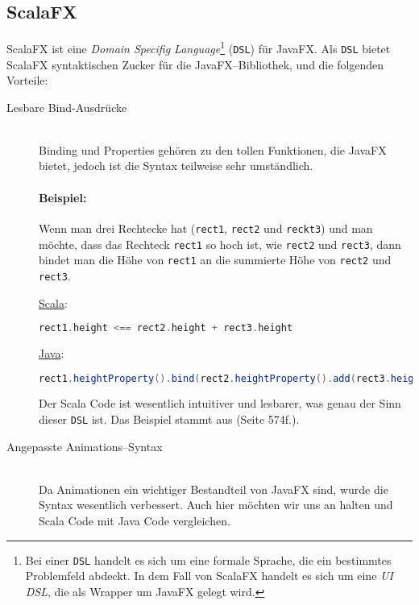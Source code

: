 \subsection{ScalaFX}
ScalaFX ist eine \textit{Domain Specifig Language}\footnote{Bei einer \texttt{DSL} handelt es sich um eine formale Sprache, die ein bestimmtes Problemfeld abdeckt. In dem Fall von ScalaFX handelt es sich um eine \textit{UI DSL}, die als Wrapper um JavaFX gelegt wird.} (\texttt{DSL}) für JavaFX. Als \texttt{DSL} bietet ScalaFX syntaktischen Zucker für die JavaFX--Bibliothek, und die folgenden Vorteile:

\begin{description}
\item[Lesbare Bind-Ausdrücke]\hfill\\
Binding und Properties gehören zu den tollen Funktionen, die JavaFX bietet, jedoch ist die Syntax teilweise sehr umständlich.
\paragraph{Beispiel:} Wenn man drei Rechtecke hat (\texttt{rect1}, \texttt{rect2} und \texttt{reckt3}) und man möchte, dass das Rechteck \texttt{rect1} so hoch ist, wie \texttt{rect2} und \texttt{rect3}, dann bindet man die Höhe von \texttt{rect1} an die summierte Höhe von \texttt{rect2} und \texttt{rect3}.

\underline{Scala}:
\begin{lstlisting}[language=scala,caption=Scala Beispiel Code für natürliche Bindings,numbers=none]
rect1.height <== rect2.height + rect3.height
\end{lstlisting}

\underline{Java}:
\begin{lstlisting}[language=Java,caption=Das selbe Beispiel in Java,numbers=none]
rect1.heightProperty().bind(rect2.heightProperty().add(rect3.heightProperty()))
\end{lstlisting}

Der Scala Code ist wesentlich intuitiver und lesbarer, was genau der Sinn dieser \texttt{DSL} ist. Das Beispiel stammt aus \cite{ProJavaFX8} (Seite 574f.).

\item[Angepasste Animations--Syntax]\hfill\\
Da Animationen ein wichtiger Bestandteil von JavaFX sind, wurde die Syntax wesentlich verbessert. Auch hier möchten wir uns an \cite{ProJavaFX8} halten und Scala Code mit Java Code vergleichen.


\end{description}
